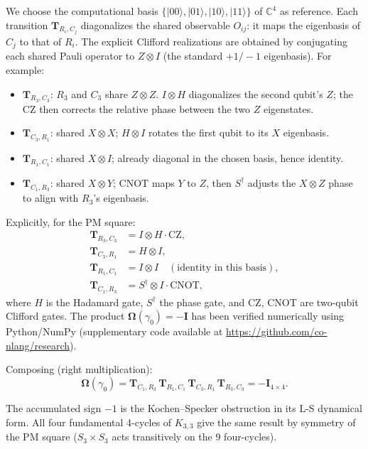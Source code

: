 \documentclass[11pt]{article}
\begin{document}
We choose the computational basis $\{|00\rangle, |01\rangle, |10\rangle,
|11\rangle\}$ of $\mathbb{C}^4$ as reference. Each transition $\mathbf{T}_{R_i, C_j}$
diagonalizes the shared observable $O_{ij}$: it maps the eigenbasis of $C_j$
to that of $R_i$. The explicit Clifford realizations are obtained by
conjugating each shared Pauli operator to $Z \otimes I$ (the standard
$+1/-1$ eigenbasis). For example:
\begin{itemize}
  \item $\mathbf{T}_{R_3, C_3}$: $R_3$ and $C_3$ share $Z \otimes Z$.
    $I\otimes H$ diagonalizes the second qubit's $Z$; the $\mathrm{CZ}$
    then corrects the relative phase between the two $Z$ eigenstates.
  \item $\mathbf{T}_{C_3, R_1}$: shared $X \otimes X$;
    $H \otimes I$ rotates the first qubit to its $X$ eigenbasis.
  \item $\mathbf{T}_{R_1, C_1}$: shared $X \otimes I$; already
    diagonal in the chosen basis, hence identity.
  \item $\mathbf{T}_{C_1, R_3}$: shared $X \otimes Y$;
    $\mathrm{CNOT}$ maps $Y$ to $Z$, then $S^\dagger$ adjusts
    the $X \otimes Z$ phase to align with $R_3$'s eigenbasis.
\end{itemize}

Explicitly, for the PM square:
\begin{align*}
\mathbf{T}_{R_3, C_3} &= I \otimes H \cdot \mathrm{CZ}, \\
\mathbf{T}_{C_3, R_1} &= H \otimes I, \\
\mathbf{T}_{R_1, C_1} &= I \otimes I \quad (\text{identity in this basis}), \\
\mathbf{T}_{C_1, R_3} &= S^\dagger \otimes I \cdot \mathrm{CNOT},
\end{align*}
where $H$ is the Hadamard gate, $S^\dagger$ the phase gate, and
$\mathrm{CZ}$, $\mathrm{CNOT}$ are two-qubit Clifford gates. The product
$\mathbf{\Omega}(\gamma_0) = -\mathbf{I}$ has been verified numerically
using Python/NumPy (supplementary code available at
\url{https://github.com/co-nlang/research}).

Composing (right multiplication):
\[
\mathbf{\Omega}(\gamma_0) = \mathbf{T}_{C_1, R_3} \,\mathbf{T}_{R_1, C_1}
\,\mathbf{T}_{C_3, R_1} \,\mathbf{T}_{R_3, C_3} = -\mathbf{I}_{4\times 4}.
\]

The accumulated sign $-1$ is the Kochen--Specker obstruction in its
L-S dynamical form. All four fundamental 4-cycles of $K_{3,3}$ give
the same result by symmetry of the PM square ($S_3 \times S_3$ acts transitively
on the 9 four-cycles).
\end{document}
